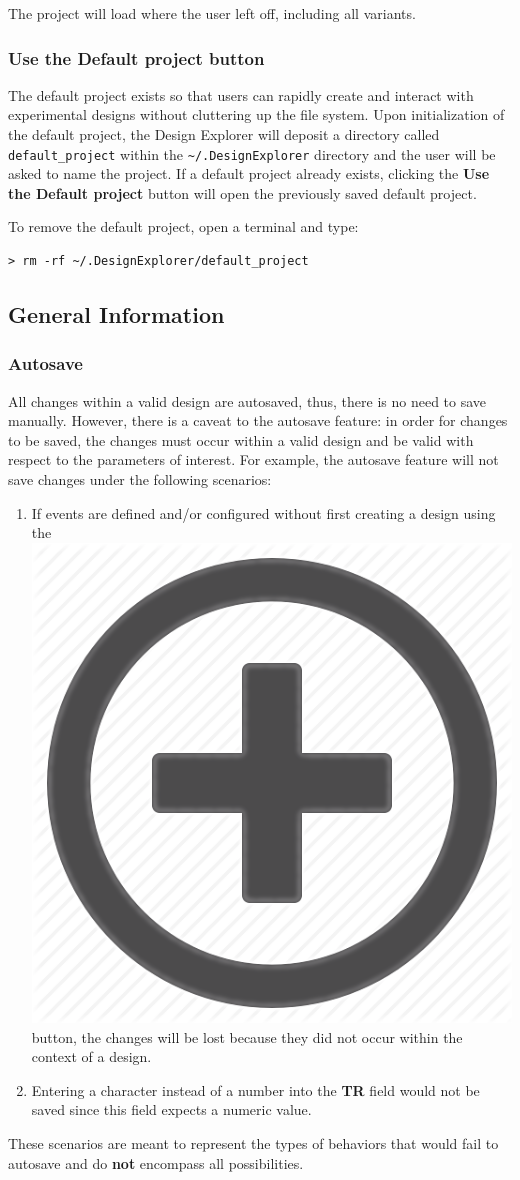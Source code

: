 \documentclass[10pt]{article}
\newcommand*{\nbut}{\includegraphics[scale=0.02]{fig/0_new.png}}
\begin{document}
			The project will load where the user left off, including all variants.

		\subsubsection{Use the Default project button}
		\label{subsec:default}
			The default project exists so that users can rapidly create and interact with experimental designs without cluttering up the file system.
			Upon initialization of the default project, the Design Explorer will deposit a directory called \texttt{default\_project} within the \texttt{\textasciitilde/.DesignExplorer} directory and the user will be asked to name the project.
			If a default project already exists, clicking the \textbf{Use the Default project} button will open the previously saved default project.

			To remove the default project, open a terminal and type:
\begin{lstlisting}
> rm -rf ~/.DesignExplorer/default_project
\end{lstlisting}

	\subsection{General Information}
	\label{subsec:general}

		\subsubsection{Autosave}
		\label{subsubsec:save}
			All changes within a valid design are autosaved, thus, there is no need to save manually.
			However, there is a caveat to the autosave feature: in order for changes to be saved, the changes must occur within a valid design and be valid with respect to the parameters of interest.
			For example, the autosave feature will not save changes under the following scenarios:
			\begin{enumerate}
				\item If events are defined and/or configured without first creating a design using the \nbut{} button, the changes will be lost because they did not occur within the context of a design.
				\item Entering a character instead of a number into the \textbf{TR} field would not be saved since this field expects a numeric value.
			\end{enumerate}

			These scenarios are meant to represent the types of behaviors that would fail to autosave and do \textbf{not} encompass all possibilities.
\end{document}
